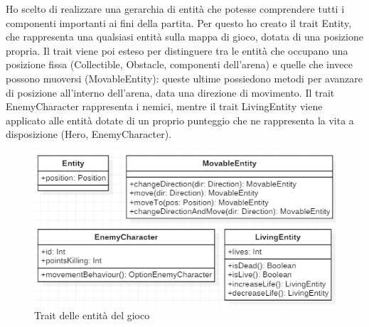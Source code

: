 Ho scelto di realizzare una gerarchia di entità che potesse comprendere tutti i componenti importanti ai fini della partita. Per questo ho creato il trait Entity, che rappresenta una qualsiasi entità sulla mappa di gioco, dotata di una posizione propria. Il trait viene poi esteso per distinguere tra le entità che occupano una posizione fissa (Collectible, Obstacle, componenti dell'arena) e quelle che invece possono muoversi (MovableEntity): queste ultime possiedono metodi per avanzare di posizione all'interno dell'arena, data una direzione di movimento. Il trait EnemyCharacter rappresenta i nemici, mentre il trait LivingEntity viene applicato alle entità dotate di un proprio punteggio che ne rappresenta la vita a disposizione (Hero, EnemyCharacter).
\begin{figure}[H]
  \includegraphics[width=15cm]{res/entitiesTraits.png}
  \caption{Trait delle entità del gioco}
  \label{entityTraits}
\end{figure}